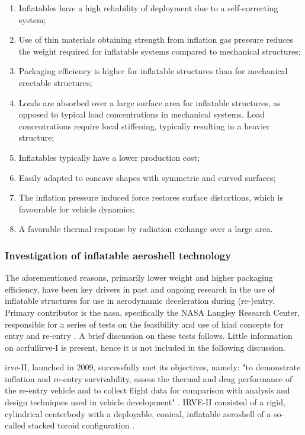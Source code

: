 \begin{enumerate}
\item Inflatables have a high reliability of deployment due to a self-correcting system;
\item Use of thin materials obtaining strength from inflation gas pressure reduces the weight required for inflatable systems compared to mechanical structures;
\item Packaging efficiency is higher for inflatable structures than for mechanical erectable structures;
\item Loads are absorbed over a large surface area for inflatable structures, as opposed to typical load concentrations in mechanical systems. Load concentrations require local stiffening, typically resulting in a heavier structure;
\item Inflatables typically have a lower production cost;
\item Easily adapted to concave shapes with symmetric and curved surfaces;
\item The inflation pressure induced force restores surface distortions, which is favourable for vehicle dynamics;
\item A favorable thermal response by radiation exchange over a large area.
\end{enumerate}

\subsubsection{Investigation of inflatable aeroshell technology}
The aforementioned reasons, primarily lower weight and higher packaging efficiency, have been key drivers in past and ongoing research in the use of inflatable structures for use in aerodynamic deceleration during (re-)entry. Primary contributor is the \gls{nasa}, specifically the NASA Langley Research Center, responsible for a series of tests on the feasibility and use of \gls{hiad} concepts for entry and re-entry \cite{Hughes2005, Dillman2010, Dillman2012, Dillman2014}. A brief discussion on these tests follows. Little information on acrfull{irve}-I \cite{Hughes2005} is present, hence it is not included in the following discussion.  

\gls{irve}-II, launched in 2009, successfully met its objectives, namely: "to demonstrate inflation and re-entry survivability, assess the thermal and drag performance of the re-entry vehicle and to collect flight data for comparison with analysis and design techniques used in vehicle development" \cite[p.1]{Dillman2010}. IRVE-II consisted of a rigid, cylindrical centerbody with a deployable, conical, inflatable aeroshell of a so-called stacked toroid configuration \cite{Smith2010,Bose2009}.

